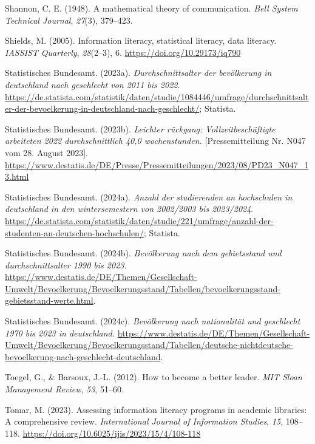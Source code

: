 \documentclass[
  12pt,
  a4paper,
  twoside]{article}
\newlength{\cslhangindent}
\newenvironment{CSLReferences}[2] %
 {\begin{list}{}{%
  \setlength{\itemindent}{0pt}
  \setlength{\leftmargin}{0pt}
  \setlength{\parsep}{0pt}
  \ifodd #1
   \setlength{\leftmargin}{\cslhangindent}
   \setlength{\itemindent}{-1\cslhangindent}
  \fi
  \setlength{\itemsep}{#2\baselineskip}}}
 {\end{list}}
\begin{document}
\begin{CSLReferences}{1}{0}
Shannon, C. E. (1948). A mathematical theory of communication. \emph{Bell System Technical Journal}, \emph{27}(3), 379--423.

Shields, M. (2005). Information literacy, statistical literacy, data literacy. \emph{IASSIST Quarterly}, \emph{28}(2--3), 6. \url{https://doi.org/10.29173/iq790}

Statistisches Bundesamt. (2023a). \emph{Durchschnittsalter der bevölkerung in deutschland nach geschlecht von 2011 bis 2022}. \url{https://de.statista.com/statistik/daten/studie/1084446/umfrage/durchschnittsalter-der-bevoelkerung-in-deutschland-nach-geschlecht/}; Statista.

Statistisches Bundesamt. (2023b). \emph{Leichter rückgang: Vollzeitbeschäftigte arbeiteten 2022 durchschnittlich 40,0 wochenstunden.} {[}Pressemitteilung Nr. N047 vom 28. August 2023{]}. \url{https://www.destatis.de/DE/Presse/Pressemitteilungen/2023/08/PD23_N047_13.html}

Statistisches Bundesamt. (2024a). \emph{Anzahl der studierenden an hochschulen in deutschland in den wintersemestern von 2002/2003 bis 2023/2024}. \url{https://de.statista.com/statistik/daten/studie/221/umfrage/anzahl-der-studenten-an-deutschen-hochschulen/}; Statista.

Statistisches Bundesamt. (2024b). \emph{Bevölkerung nach dem gebietsstand und durchschnitts­alter 1990 bis 2023.} \url{https://www.destatis.de/DE/Themen/Gesellschaft-Umwelt/Bevoelkerung/Bevoelkerungsstand/Tabellen/bevoelkerungsstand-gebietsstand-werte.html}.

Statistisches Bundesamt. (2024c). \emph{Bevölkerung nach nationalität und geschlecht 1970 bis 2023 in deutschland.} \url{https://www.destatis.de/DE/Themen/Gesellschaft-Umwelt/Bevoelkerung/Bevoelkerungsstand/Tabellen/deutsche-nichtdeutsche-bevoelkerung-nach-geschlecht-deutschland}.

Toegel, G., \& Barsoux, J.-L. (2012). How to become a better leader. \emph{MIT Sloan Management Review}, \emph{53}, 51--60.

Tomar, M. (2023). Assessing information literacy programs in academic libraries: A comprehensive review. \emph{International Journal of Information Studies}, \emph{15}, 108--118. \url{https://doi.org/10.6025/ijis/2023/15/4/108-118}


\end{CSLReferences}
\end{document}
